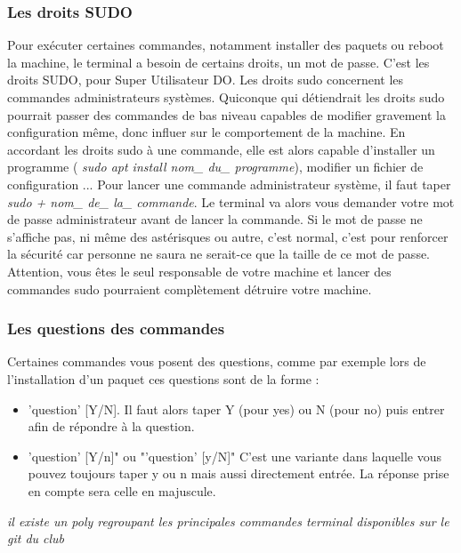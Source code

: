 \subsubsection{Les droits SUDO}
Pour exécuter certaines commandes, notamment installer des paquets ou reboot la machine, le terminal a besoin de certains droits,
 un mot de passe.  C'est les droits SUDO, pour Super Utilisateur DO.
Les droits sudo concernent les commandes administrateurs systèmes. Quiconque qui détiendrait les droits sudo pourrait passer des
commandes de bas niveau capables de modifier gravement la configuration même, donc influer sur le comportement de la machine.
En accordant les droits sudo à une commande, elle est alors capable d'installer un programme
( \textit{sudo apt install nom\_ du\_ programme}), modifier un fichier de configuration ...
Pour lancer une commande administrateur système, il faut taper \textit{sudo + nom\_ de\_ la\_ commande}.
Le terminal va alors vous demander votre mot de passe administrateur avant de lancer la commande.
Si le mot de passe ne s'affiche pas, ni même des astérisques ou autre, c'est normal, c'est pour renforcer la sécurité
car personne ne saura ne serait-ce que la taille de ce mot de passe. Attention, vous êtes le seul responsable de votre machine
et lancer des commandes sudo pourraient complètement détruire votre machine.

\subsubsection{Les questions des commandes}
Certaines commandes vous posent des questions, comme par exemple lors de l'installation d'un paquet
ces questions sont de la forme :

\begin{itemize}
\item 'question' [Y/N]. Il faut alors taper Y (pour yes) ou N (pour no) puis entrer afin de répondre à la question.
\item 'question' [Y/n]" ou "'question' [y/N]" C'est une variante dans laquelle vous pouvez toujours taper y ou n
mais aussi directement entrée. La réponse prise en compte sera celle en majuscule.
\end{itemize}

\textit{il existe un poly regroupant les principales commandes terminal disponibles sur le git du club}
